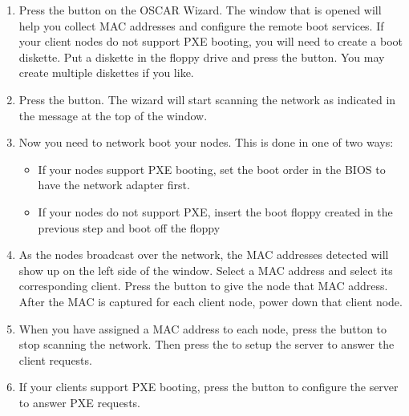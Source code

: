 \begin {enumerate}
  
\item Press the  button on the OSCAR Wizard.
  The window that is opened will help you collect MAC addresses and
  configure the remote boot services. If your client nodes do not
  support PXE booting, you will need to create a boot diskette. Put a
  diskette in the floppy drive and press the  button. You may create multiple diskettes if you like.


\item Press the  button. The wizard will
  start scanning the network as indicated in the message at the top of
  the window.

  
\item Now you need to network boot your nodes. This is done in one of
  two ways:

  \begin{itemize}
  \item If your nodes support PXE booting, set the boot order in the
    BIOS to have the network adapter first.
  \item If your nodes do not support PXE, insert the boot floppy
    created in the previous step and boot off the floppy
  \end{itemize}
        
  
\item As the nodes broadcast over the network, the MAC addresses
  detected will show up on the left side of the window. Select a MAC
  address and select its corresponding client. Press the
   button to give the node that MAC
  address.  After the MAC is captured for each client node, power down
  that client node.


\item When you have assigned a MAC address to each node, press the
   button to stop scanning the network. Then
  press the  to setup the server to
  answer the client requests.


\item If your clients support PXE booting, press the  button to configure the server to answer PXE
  requests.


\end{enumerate}
